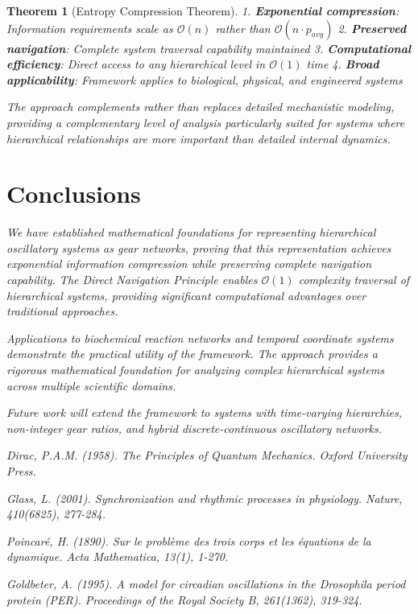 \documentclass[11pt]{article}
\newtheorem{theorem}{Theorem}[section]
\theoremstyle{remark}
\begin{document}
\begin{theorem}[Entropy Compression Theorem]
1. \textbf{Exponential compression}: Information requirements scale as $\mathcal{O}(n)$ rather than $\mathcal{O}(n \cdot p_{avg})$
2. \textbf{Preserved navigation}: Complete system traversal capability maintained
3. \textbf{Computational efficiency}: Direct access to any hierarchical level in $\mathcal{O}(1)$ time
4. \textbf{Broad applicability}: Framework applies to biological, physical, and engineered systems

The approach complements rather than replaces detailed mechanistic modeling, providing a complementary level of analysis particularly suited for systems where hierarchical relationships are more important than detailed internal dynamics.

\section{Conclusions}

We have established mathematical foundations for representing hierarchical oscillatory systems as gear networks, proving that this representation achieves exponential information compression while preserving complete navigation capability. The Direct Navigation Principle enables $\mathcal{O}(1)$ complexity traversal of hierarchical systems, providing significant computational advantages over traditional approaches.

Applications to biochemical reaction networks and temporal coordinate systems demonstrate the practical utility of the framework. The approach provides a rigorous mathematical foundation for analyzing complex hierarchical systems across multiple scientific domains.

Future work will extend the framework to systems with time-varying hierarchies, non-integer gear ratios, and hybrid discrete-continuous oscillatory networks.

\begin{thebibliography}{99}

Dirac, P.A.M. (1958). \textit{The Principles of Quantum Mechanics}. Oxford University Press.

Glass, L. (2001). Synchronization and rhythmic processes in physiology. \textit{Nature}, 410(6825), 277-284.

Poincaré, H. (1890). Sur le problème des trois corps et les équations de la dynamique. \textit{Acta Mathematica}, 13(1), 1-270.

Goldbeter, A. (1995). A model for circadian oscillations in the \textit{Drosophila} period protein (PER). \textit{Proceedings of the Royal Society B}, 261(1362), 319-324.


\end{thebibliography}
\end{theorem}
\end{document}
